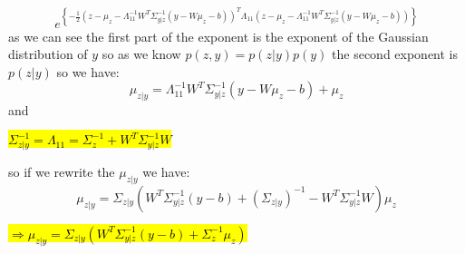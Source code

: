 \begin{qsolve}
\begin{qsolve}[]
		$$e^{\left\{-\frac{1}{2} (z-\mu_z - \Lambda_{11}^{-1}W^T\Sigma_{y|z}^{-1}(y-W\mu_z - b))^T \Lambda_{11} (z-\mu_z - \Lambda_{11}^{-1}W^T\Sigma_{y|z}^{-1}(y-W\mu_z - b))\right\}}$$	
		as we can see the first part of the exponent is the exponent of the Gaussian distribution of $y$ so as we know $p(z,y) = p(z|y)p(y)$ the second exponent is $p(z|y)$ so we have:
		$$\mu_{z|y} = \Lambda_{11}^{-1}W^T\Sigma_{y|z}^{-1}(y-W\mu_z - b) + \mu_z$$
		and
		\begin{center}
			\hl{$\Sigma_{z|y}^{-1} = \Lambda_{11} = \Sigma_z^{-1} + W^T\Sigma_{y|z}^{-1}W$}
		\end{center}
		so if we rewrite the $\mu_{z|y}$ we have:
		$$\mu_{z|y} = \Sigma_{z|y}(W^T\Sigma_{y|z}^{-1}(y-b) + (\Sigma_{z|y})^{-1} - W^T\Sigma_{y|z}^{-1}W) \mu_z$$ 
		\begin{center}
			\hl{$ \Rightarrow \mu_{z|y} = \Sigma_{z|y}(W^T\Sigma_{y|z}^{-1}(y-b) + \Sigma_{z}^{-1} \mu_z)$}
		\end{center}
	\end{qsolve}
\end{qsolve}
